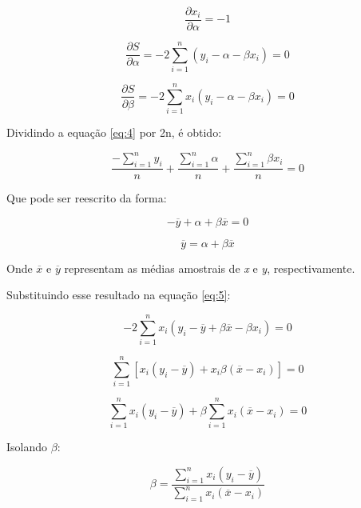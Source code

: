 \begin{equation*}
\frac{\partial x_i}{\partial \alpha} = -1
\end{equation*}

\begin{equation}\label{eq:4}
\frac{\partial S}{\partial \alpha} = -2 \sum_{i=1}^{n} (y_i - \alpha - \beta x_i) = 0
\end{equation}

\begin{equation}\label{eq:5}
\frac{\partial S}{\partial \beta} = -2 \sum_{i=1}^{n} x_i (y_i - \alpha - \beta x_i) = 0
\end{equation}

Dividindo a equação \ref{eq:4} por 2n, é obtido:

\begin{equation*}
 \frac {-\sum_{i=1}^{n}y_i}{n} + \frac{\sum_{i=1}^{n}\alpha}{n} + \frac{\sum_{i=1}^{n}\beta x_i}{n} = 0
\end{equation*}

Que pode ser reescrito da forma:

\begin{equation*}
 - \overline{y} + \alpha + \beta \overline{x} = 0 
\end{equation*}

\begin{equation}\label{eq:6}
\overline{y}  = \alpha + \beta \overline{x} 
\end{equation}

Onde $\overline{x}$ e $\overline{y}$ representam as médias amostrais de \textit{x} e \textit{y}, respectivamente.

Substituindo esse resultado na equação \ref{eq:5}:

\begin{equation*}
-2 \sum_{i=1}^{n} x_i (y_i - \overline{y} + \beta \overline{x} - \beta x_i) = 0
\end{equation*}

\begin{equation*}
\sum_{i=1}^{n}[x_i (y_i - \overline{y}) + x_i \beta (\overline{x} - x_i)] = 0
\end{equation*}

\begin{equation*}
\sum_{i=1}^{n} x_i (y_i - \overline{y}) + \beta \sum_{i=1}^{n} x_i  (\overline{x} - x_i) = 0
\end{equation*}

Isolando $\beta$:

\begin{equation}\label{eq:7}
\beta = \frac{\sum_{i=1}^{n} x_i (y_i - \overline{y})}{\sum_{i=1}^{n} x_i(\overline{x} - x_i)}
\end{equation}

